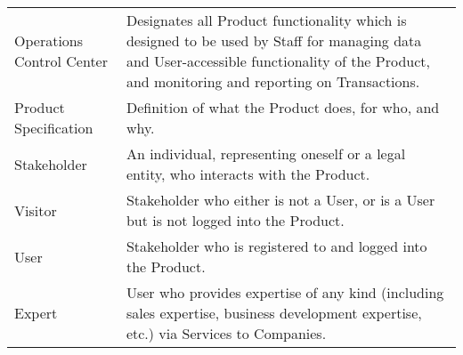 \begin{longtable}{lp{7.5cm}}
Operations Control Center  & Designates all Product functionality which is designed to be used by Staff for managing data and User-accessible functionality of the Product, and monitoring and reporting on Transactions.                                                                                                                                                                              \\
Product Specification      & Definition of what the Product does, for who, and why.                                                                                                                                                                                                                                                                                                                    \\
Stakeholder                & An individual, representing oneself or a legal entity, who interacts with the Product.                                                                                                                                                                                                                                                                                    \\
Visitor                    & Stakeholder who either is not a User, or is a User but is not logged into the Product.                                                                                                                                                                                                                                                                                    \\
User                       & Stakeholder who is registered to and logged into the Product.                                                                                                                                                                                                                                                                                                             \\
Expert                     & User who provides expertise of any kind (including sales expertise, business development expertise, etc.) via Services to Companies.                                                                                                                                                                                                                                      \\

\end{longtable}
